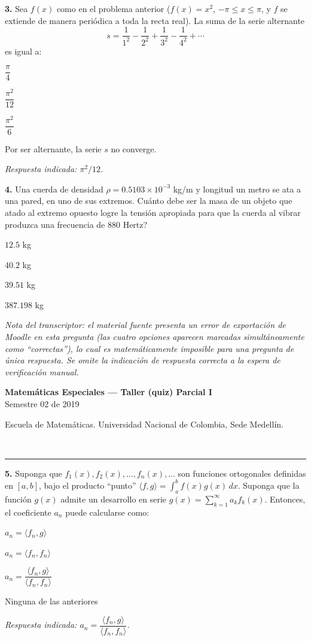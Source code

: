 \documentclass[11pt]{article}
\newcommand{\examheader}{%
  \noindent
  \begin{minipage}[t]{0.6\linewidth}
    {\small\bfseries Matem\'aticas Especiales --- Taller (quiz) Parcial I}\\
    {\small Semestre 02 de 2019}
  \end{minipage}%
  \hfill
  \begin{minipage}[t]{0.35\linewidth}
    \raggedleft\small Escuela de Matem\'aticas. Universidad Nacional de Colombia, Sede Medell\'in.
  \end{minipage}\\[2pt]
  \rule{\linewidth}{0.6pt}
}
\begin{document}
\vspace{10pt}
\textbf{3.} Sea $f(x)$ como en el problema anterior ($f(x)=x^2$, $-\pi\leq x\leq \pi$, y $f$ se extiende de manera peri\'odica a toda la recta real). La suma de la serie alternante
\[
s = \frac{1}{1^2} - \frac{1}{2^2} + \frac{1}{3^2} - \frac{1}{4^2} + \cdots
\]
es igual a:
\begin{opciones}
  \item $\dfrac{\pi}{4}$
  \item $\dfrac{\pi^2}{12}$
  \item $\dfrac{\pi^2}{6}$
  \item Por ser alternante, la serie $s$ no converge.
\end{opciones}
\textit{Respuesta indicada: $\pi^2/12$.}

\vspace{10pt}
\textbf{4.} Una cuerda de densidad $\rho = 0.5103\times 10^{-3}$ kg/m y longitud un metro se ata a una pared, en uno de sus extremos. \textquestiondown Cu\'anto debe ser la masa de un objeto que atado al extremo opuesto logre la tensi\'on apropiada para que la cuerda al vibrar produzca una frecuencia de 880 Hertz?
\begin{opciones}
  \item $12.5$ kg
  \item $40.2$ kg
  \item $39.51$ kg
  \item $387.198$ kg
\end{opciones}
\textit{Nota del transcriptor: el material fuente presenta un error de exportaci\'on de Moodle en esta pregunta (las cuatro opciones aparecen marcadas simult\'aneamente como ``correctas''), lo cual es matem\'aticamente imposible para una pregunta de \'unica respuesta. Se omite la indicaci\'on de respuesta correcta a la espera de verificaci\'on manual.}

\clearpage
\examheader
\vspace{6pt}

\textbf{5.} Suponga que $f_1(x), f_2(x), \ldots, f_n(x), \ldots$ son funciones ortogonales definidas en $[a,b]$, bajo el producto ``punto'' $\langle f,g\rangle = \int_a^b f(x)g(x)\,dx$. Suponga que la funci\'on $g(x)$ admite un desarrollo en serie $g(x) = \sum_{k=1}^{\infty} a_k f_k(x)$. Entonces, el coeficiente $a_n$ puede calcularse como:
\begin{opciones}
  \item $a_n = \langle f_n, g\rangle$
  \item $a_n = \langle f_n, f_n\rangle$
  \item $a_n = \dfrac{\langle f_n,g\rangle}{\langle f_n,f_n\rangle}$
  \item Ninguna de las anteriores
\end{opciones}
\textit{Respuesta indicada: $a_n = \dfrac{\langle f_n,g\rangle}{\langle f_n,f_n\rangle}$.}
\end{document}
